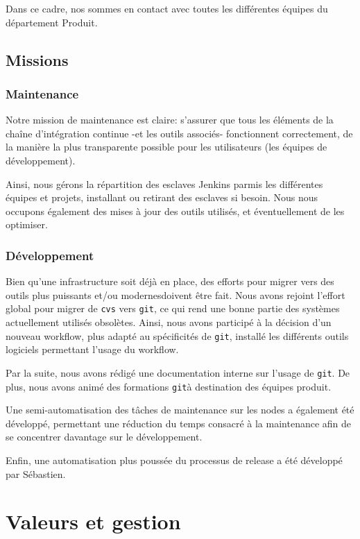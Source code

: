 \documentclass[a4paper, 12pt]{article}
\newcommand{\git}{\texttt{git}}
\begin{document}
Dans ce cadre, nos sommes en contact avec toutes les différentes équipes du département Produit.

\subsection{Missions}
\subsubsection{Maintenance}

Notre mission de maintenance est claire: s'assurer que tous les éléments de la chaîne d'intégration continue -et les outils associés- fonctionnent correctement, de la manière la plus transparente possible pour les utilisateurs (les équipes de développement).

Ainsi, nous gérons la répartition des esclaves Jenkins parmis les différentes équipes et projets, installant ou retirant des esclaves si besoin. Nous nous occupons également des mises à jour des outils utilisés, et éventuellement de les optimiser.

\subsubsection{Développement}

Bien qu'une infrastructure soit déjà en place, des efforts pour migrer vers des outils plus puissants et/ou modernesdoivent être fait. Nous avons rejoint l'effort global pour migrer de \texttt{cvs} vers \git, ce qui rend une bonne partie des systèmes actuellement utilisés obsolètes. Ainsi, nous avons participé à la décision d'un nouveau workflow, plus adapté au spécificités de \git, installé les différents outils logiciels permettant l'usage du workflow.

Par la suite, nous avons rédigé une documentation interne sur l'usage de \git. De plus, nous avons animé des formations \git à destination des équipes produit.

Une semi-automatisation des tâches de maintenance sur les nodes a également été développé, permettant une réduction du temps consacré à la maintenance afin de se concentrer davantage sur le développement.

Enfin, une automatisation plus poussée du processus de release a été développé par Sébastien.

\section{Valeurs et gestion}
\end{document}
